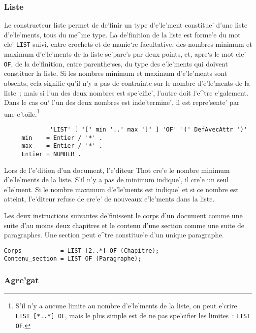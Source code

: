 {\subsubsection{Liste}

Le constructeur liste permet de de'finir un type d'e'le'ment constitue'
d'une liste d'e'le'ments, tous du me^me type. La de'finition de la liste
est forme'e du mot cle' {\tt LIST} suivi, entre crochets et de manie`re
facultative, des nombres minimum et maximum d'e'le'ments de la liste
se'pare's par deux points, et, apre`s le mot cle'
{\tt OF}, de la de'finition, entre parenthe`ses, du type des e'le'ments qui
doivent constituer la liste. Si les nombres minimum et maximum d'e'le'ments
sont absents, cela signifie qu'il n'y a pas de contrainte sur le nombre
d'e'le'ments de la liste~; mais si l'un des deux nombres est spe'cifie',
l'autre doit l'e^tre e'galement. Dans le cas ou` l'un des deux nombres est
inde'termine', il est repre'sente' par une e'toile.\footnote{S'il n'y a
aucune limite au nombre d'e'le'ments de la liste, on peut e'crire
{\tt LIST [\verb|*|..\verb|*|] OF}, mais le plus simple est de ne pas
spe'cifier les limites~: {\tt LIST OF}.}

\begin{verbatim}
             'LIST' [ '[' min '..' max ']' ] 'OF' '(' DefAvecAttr ')'
     min    = Entier / '*' .
     max    = Entier / '*' .
     Entier = NUMBER .
\end{verbatim}

Lors de l'e'dition d'un document, l'e'diteur Thot cre'e le nombre minimum
d'e'le'ments de la liste. S'il n'y a pas de minimum indique', il cre'e un seul
e'le'ment. Si le nombre maximum d'e'le'ments est indique' et si ce nombre est
atteint, l'e'diteur refuse de cre'e' de nouveaux e'le'ments dans la liste.

\begin{example}
Les deux instructions suivantes de'finissent le corps d'un document comme
une suite d'au moins deux chapitres et le contenu d'une section comme une
suite de paragraphes. Une section peut e^tre constitue'e d'un unique
paragraphe.

\begin{verbatim}
Corps           = LIST [2..*] OF (Chapitre);
Contenu_section = LIST OF (Paragraphe);
\end{verbatim}
\end{example}

\subsubsection{Agre'gat}

}
